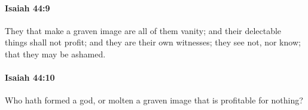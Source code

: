 		\paragraph{Isaiah 44:9} %
			\label{ISAIAH-44-9}

			They that make a graven image are all of them vanity; and their delectable things shall not profit; and they are their own witnesses; they see not, nor know; that they may be ashamed.


		\paragraph{Isaiah 44:10} %
			\label{ISAIAH-44-10}

			Who hath formed a god, or molten a graven image that is profitable for nothing?


